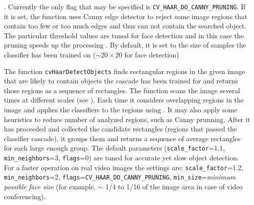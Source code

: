 \begin{description}
. Currently the only flag that may be specified is \texttt{CV\_HAAR\_DO\_CANNY\_PRUNING}. If it is set, the function uses Canny edge detector to reject some image regions that contain too few or too much edges and thus can not contain the searched object. The particular threshold values are tuned for face detection and in this case the pruning speeds up the processing
. By default, it is set to the size of samples the classifier has been trained on ($\sim 20\times 20$ for face detection)
\end{description}

The function \texttt{cvHaarDetectObjects} finds rectangular regions in the given image that are likely to contain objects the cascade has been trained for and returns those regions as a sequence of rectangles. The function scans the image several times at different scales (see ). Each time it considers overlapping regions in the image and applies the classifiers to the regions using . It may also apply some heuristics to reduce number of analyzed regions, such as Canny prunning. After it has proceeded and collected the candidate rectangles (regions that passed the classifier cascade), it groups them and returns a sequence of average rectangles for each large enough group. The default parameters (\texttt{scale\_factor}=1.1, \texttt{min\_neighbors}=3, \texttt{flags}=0) are tuned for accurate yet slow object detection. For a faster operation on real video images the settings are: \texttt{scale\_factor}=1.2, \texttt{min\_neighbors}=2, \texttt{flags}=\texttt{CV\_HAAR\_DO\_CANNY\_PRUNING}, \texttt{min\_size}=\textit{minimum possible face size} (for example, $\sim$ 1/4 to 1/16 of the image area in case of video conferencing).

